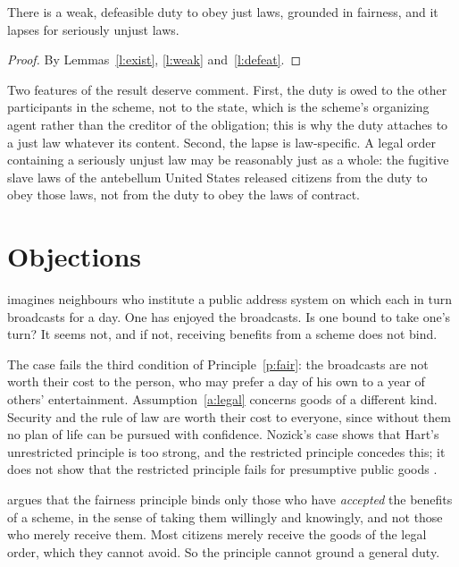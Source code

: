 \documentclass{situationist-preprint}
\begin{document}
\begin{theorem}\label{t:main}
There is a weak, defeasible duty to obey just laws, grounded in fairness, and it lapses for seriously unjust laws.
\end{theorem}

\begin{proof}
By Lemmas~\ref{l:exist}, \ref{l:weak} and~\ref{l:defeat}.
\end{proof}

Two features of the result deserve comment. First, the duty is owed to the other participants in the scheme, not to the state, which is the scheme's organizing agent rather than the creditor of the obligation; this is why the duty attaches to a just law whatever its content. Second, the lapse is law-specific. A legal order containing a seriously unjust law may be reasonably just as a whole: the fugitive slave laws of the antebellum United States released citizens from the duty to obey those laws, not from the duty to obey the laws of contract.

\section{Objections}

\begin{objection}
\citet[ch.~5]{Nozick1974} imagines neighbours who institute a public address system on which each in turn broadcasts for a day. One has enjoyed the broadcasts. Is one bound to take one's turn? It seems not, and if not, receiving benefits from a scheme does not bind.
\end{objection}

\begin{reply}
The case fails the third condition of Principle~\ref{p:fair}: the broadcasts are not worth their cost to the person, who may prefer a day of his own to a year of others' entertainment. Assumption~\ref{a:legal} concerns goods of a different kind. Security and the rule of law are worth their cost to everyone, since without them no plan of life can be pursued with confidence. Nozick's case shows that Hart's unrestricted principle is too strong, and the restricted principle concedes this; it does not show that the restricted principle fails for presumptive public goods \citep{Klosko1992}.
\end{reply}

\begin{objection}
\citet{Simmons1979} argues that the fairness principle binds only those who have \emph{accepted} the benefits of a scheme, in the sense of taking them willingly and knowingly, and not those who merely receive them. Most citizens merely receive the goods of the legal order, which they cannot avoid. So the principle cannot ground a general duty.
\end{objection}
\end{document}
